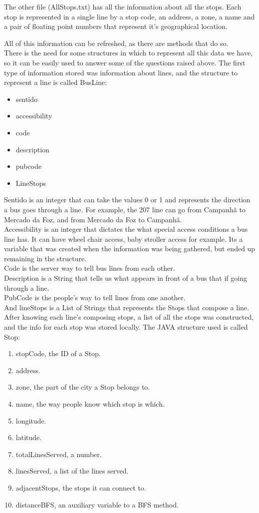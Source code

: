 \documentclass[12pt]{article}
\begin{document}
\begin{multicols}{2}
The other file (AllStops.txt) has all the information about all the stops.
Each stop is represented in a single line by a stop code, an address, a zone, a name and a pair of floating point numbers that represent it's geographical location. 

All of this information can be refreshed, as there are methods that do so.\\

There is the need for some structures in which to represent all this data we have, so it can be easily used to answer some of the questions raised above. The first type of information stored was information about lines, and the structure to represent a line is called BusLine:
\begin{itemize}
\item sentido
\item accessibility
\item code
\item description
\item pubcode
\item LineStops
\end{itemize}
Sentido is an integer that can take the values 0 or 1 and represents the direction a bus goes through a line. For example, the 207 line can go from Campanhã to Mercado da Foz, and from Mercado da Foz to Campanhã.\\
Accessibility is an integer that dictates the what special access conditions a bus line has. It can have wheel chair access, baby stroller access for example. Its a variable that was created when the information was being gathered, but ended up remaining in the structure.\\
Code is the server way to tell bus lines from each other.\\
Description is a String that tells us what appears in front of a bus that if going through a line.\\
PubCode is the people's way to tell lines from one another.\\
And lineStops is a List of Strings that represents the Stops that compose a line.\\

After knowing each line's composing stops, a list of all the stops was constructed, and the info for each stop was stored locally. The JAVA structure used is called Stop:
\begin{enumerate}
	\item stopCode, the ID of a Stop.
	\item address.
	\item zone, the part of the city a Stop belongs to.
	\item name, the way people know which stop is which.
	\item longitude.
	\item latitude.
	\item totalLinesServed, a number.
	\item linesServed, a list of the lines served.
	\item adjacentStops, the stops it can connect to.
	\item distanceBFS, an auxiliary variable to a BFS method.
\end{enumerate}


\end{multicols}
\end{document}
